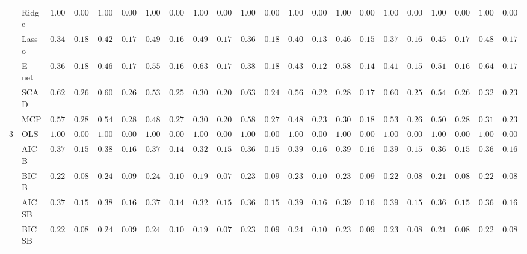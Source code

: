 \begin{tabular}{p{0.2cm}p{1cm}|p{0.6cm}p{0.6cm}|p{0.6cm}p{0.6cm}p{0.6cm}p{0.6cm}p{0.6cm}p{0.6cm}|p{0.6cm}p{0.6cm}p{0.6cm}p{0.6cm}p{0.6cm}p{0.6cm}|p{0.6cm}p{0.6cm}p{0.6cm}p{0.6cm}p{0.6cm}p{0.6cm}}
 & Ridge  & $1.0000$ & $0.0000$ & $1.0000$ & $0.0000$ & $1.0000$ & $0.0000$ & $1.0000$ & $0.0000$ & $1.0000$ & $0.0000$ & $1.0000$ & $0.0000$ & $1.0000$ & $0.0000$ & $1.0000$ & $0.0000$ & $1.0000$ & $0.0000$ & $1.0000$ & $0.0000$ \\
 & Lasso  & $0.3467$ & $0.1875$ & $0.4250$ & $0.1714$ & $0.4967$ & $0.1606$ & $0.4933$ & $0.1707$ & $0.3667$ & $0.1835$ & $0.4033$ & $0.1323$ & $0.4633$ & $0.1564$ & $0.3767$ & $0.1617$ & $0.4583$ & $0.1747$ & $0.4833$ & $0.1796$ \\
 & E-net  & $0.3600$ & $0.1891$ & $0.4600$ & $0.1710$ & $0.5550$ & $0.1608$ & $0.6350$ & $0.1784$ & $0.3867$ & $0.1802$ & $0.4383$ & $0.1290$ & $0.5867$ & $0.1469$ & $0.4150$ & $0.1598$ & $0.5183$ & $0.1673$ & $0.6417$ & $0.1747$ \\
 & SCAD  & $0.6250$ & $0.2610$ & $0.6017$ & $0.2679$ & $0.5350$ & $0.2555$ & $0.3083$ & $0.2070$ & $0.6383$ & $0.2474$ & $0.5667$ & $0.2235$ & $0.2833$ & $0.1749$ & $0.6017$ & $0.2528$ & $0.5417$ & $0.2663$ & $0.3283$ & $0.2339$ \\
 & MCP  & $0.5750$ & $0.2837$ & $0.5417$ & $0.2876$ & $0.4883$ & $0.2735$ & $0.3000$ & $0.2038$ & $0.5850$ & $0.2727$ & $0.4833$ & $0.2398$ & $0.3033$ & $0.1841$ & $0.5300$ & $0.2695$ & $0.5050$ & $0.2847$ & $0.3150$ & $0.2308$ \\\hline
3 & OLS  & $1.0000$ & $0.0000$ & $1.0000$ & $0.0000$ & $1.0000$ & $0.0000$ & $1.0000$ & $0.0000$ & $1.0000$ & $0.0000$ & $1.0000$ & $0.0000$ & $1.0000$ & $0.0000$ & $1.0000$ & $0.0000$ & $1.0000$ & $0.0000$ & $1.0000$ & $0.0000$ \\
 & AIC B  & $0.3733$ & $0.1573$ & $0.3850$ & $0.1636$ & $0.3767$ & $0.1491$ & $0.3200$ & $0.1548$ & $0.3667$ & $0.1535$ & $0.3900$ & $0.1645$ & $0.3967$ & $0.1688$ & $0.3933$ & $0.1508$ & $0.3683$ & $0.1559$ & $0.3683$ & $0.1646$ \\
 & BIC B  & $0.2250$ & $0.0898$ & $0.2400$ & $0.0927$ & $0.2400$ & $0.1041$ & $0.1967$ & $0.0763$ & $0.2383$ & $0.0984$ & $0.2383$ & $0.1012$ & $0.2317$ & $0.0974$ & $0.2283$ & $0.0875$ & $0.2133$ & $0.0857$ & $0.2250$ & $0.0866$ \\
 & AIC SB  & $0.3733$ & $0.1573$ & $0.3850$ & $0.1636$ & $0.3767$ & $0.1491$ & $0.3200$ & $0.1548$ & $0.3667$ & $0.1535$ & $0.3917$ & $0.1648$ & $0.3983$ & $0.1690$ & $0.3933$ & $0.1508$ & $0.3683$ & $0.1559$ & $0.3683$ & $0.1646$ \\
 & BIC SB  & $0.2250$ & $0.0898$ & $0.2400$ & $0.0927$ & $0.2400$ & $0.1041$ & $0.1967$ & $0.0763$ & $0.2383$ & $0.0984$ & $0.2400$ & $0.1014$ & $0.2333$ & $0.0948$ & $0.2300$ & $0.0879$ & $0.2133$ & $0.0857$ & $0.2250$ & $0.0866$ \\

\end{tabular}

